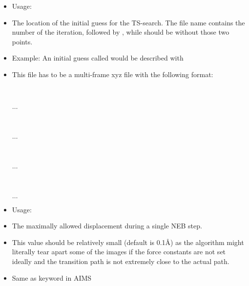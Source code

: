 {\begin{itemize}
    \item Usage:  
    \item The location of the initial guess for the TS-search. The file name contains 
      the number of the iteration, followed by , while 
       should be without those two points. 
    \item Example: An initial guess called  
      would be described with \\
    \item This file has to be a multi-frame xyz file with the following format:\\
       \\
       \\
      \\
      $\ldots$\\
      \\
      \\
      \\
      $\ldots$\\
      \\
      \\
      \\
      $\ldots$\\
      \\
      \\
      \\
      $\ldots$\\      
  \end{itemize}}

{\begin{itemize}
    \item Usage:  
    \item The maximally allowed displacement during a single NEB step.
    \item This value should be relatively small (default is 0.1\AA) as the
      algorithm might literally tear apart some of the images if the 
      force constants are not set ideally and the transition path is not 
      extremely close to the actual path. 
    \item Same as keyword  in AIMS
  \end{itemize}}

